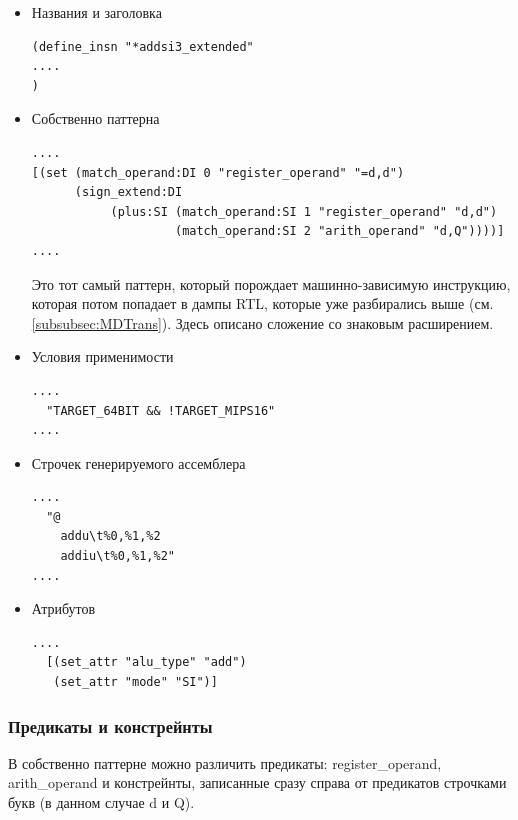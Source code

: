 \documentclass[a4paper,12pt,oneside]{article}
\begin{document}
\begin{itemize}

\item Названия и заголовка

\begin{verbatim}
(define_insn "*addsi3_extended"
....
)
\end{verbatim}

\item Собственно паттерна

\begin{verbatim}
....
[(set (match_operand:DI 0 "register_operand" "=d,d")
      (sign_extend:DI
           (plus:SI (match_operand:SI 1 "register_operand" "d,d")
                    (match_operand:SI 2 "arith_operand" "d,Q"))))]
....
\end{verbatim}

Это тот самый паттерн, который порождает машинно-зависимую инструкцию, которая потом попадает в дампы RTL, которые уже разбирались выше (см. \ref{subsubsec:MDTrans}). Здесь описано сложение со знаковым расширением.

\item Условия применимости

\begin{verbatim}
....
  "TARGET_64BIT && !TARGET_MIPS16"
....
\end{verbatim}

\item Строчек генерируемого ассемблера

\begin{verbatim}
....
  "@
    addu\t%0,%1,%2
    addiu\t%0,%1,%2"
....
\end{verbatim}

\item Атрибутов

\begin{verbatim}
....
  [(set_attr "alu_type" "add")
   (set_attr "mode" "SI")]
\end{verbatim}

\end{itemize}

\subsubsection{Предикаты и констрейнты}

В собственно паттерне можно различить предикаты: register\_operand, arith\_operand и констрейнты, записанные сразу справа от предикатов строчками букв (в данном случае d и Q).
\end{document}
